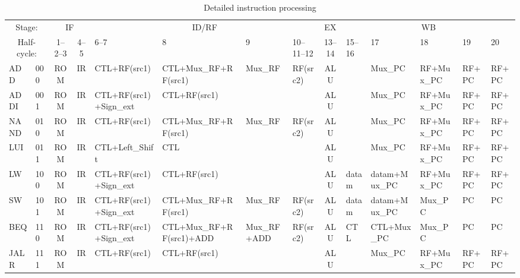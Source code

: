 \documentclass[10pt,a4paper]{article}
\theoremstyle{definition}%
\begin{document}
\setlength{\tabcolsep}{3pt} %
\begin{landscape}
\begin{table}[]
	\begin{center}
		\begin{small}
			\hspace*{-1.5cm}
				\begin{tabular}{ll|cc|llll|c|lllll}
					\toprule
					\multicolumn{2}{c|}{Stage:} & \multicolumn{2}{c|}{IF} & \multicolumn{4}{c|}{ID/RF} & EX & \multicolumn{5}{c}{WB} \\ 
					\multicolumn{2}{c|}{Half-cycle:} & 
					 1--2--3  & 4--5  & 6--7  & 8 & 9 & 10--11--12  & 13--14 & 15--16  & 17 & 18 & 19 & 20 \\ 
					\midrule
					ADD & 000 & ROM & IR & CTL+RF(src1) & CTL+Mux\_RF+RF(src1) & Mux\_RF & RF(src2) & ALU &  & Mux\_PC & RF+Mux\_PC & RF+PC & RF+PC \\ 
					ADDI & 001 & ROM & IR & CTL+RF(src1)+Sign\_ext & CTL+RF(src1) &  &  & ALU &  & Mux\_PC & RF+Mux\_PC & RF+PC & RF+PC \\ 
					NAND & 010 & ROM & IR & CTL+RF(src1) & CTL+Mux\_RF+RF(src1) & Mux\_RF & RF(src2) & ALU &  & Mux\_PC & RF+Mux\_PC & RF+PC & RF+PC \\ 
					LUI & 011 & ROM & IR & CTL+Left\_Shift & CTL &  &  & ALU &  & Mux\_PC & RF+Mux\_PC & RF+PC & RF+PC \\ 					
					LW & 100 & ROM & IR & CTL+RF(src1)+Sign\_ext & CTL+RF(src1) & & & ALU & datam & datam+Mux\_PC & RF+Mux\_PC & RF+PC & RF+PC \\
					SW & 101 & ROM & IR & CTL+RF(src1)+Sign\_ext & CTL+Mux\_RF+RF(src1) & Mux\_RF & RF(src2) & ALU & datam & datam+Mux\_PC & Mux\_PC & PC & PC \\ 
					BEQ & 110 & ROM & IR & CTL+RF(src1)+Sign\_ext & CTL+Mux\_RF+RF(src1)+ADD & Mux\_RF+ADD & RF(src2) & ALU & CTL& CTL+Mux\_PC & Mux\_PC & PC & PC \\ 
					JALR & 111 & ROM & IR & CTL+RF(src1) & CTL+RF(src1) & & & ALU &  & Mux\_PC & RF+Mux\_PC & RF+PC & RF+PC \\ 
					\bottomrule
				\end{tabular} 
		\end{small}
	\end{center}
\caption{Detailed instruction processing}
\label{tab:stages}
\end{table}
\end{landscape}
\end{document}
